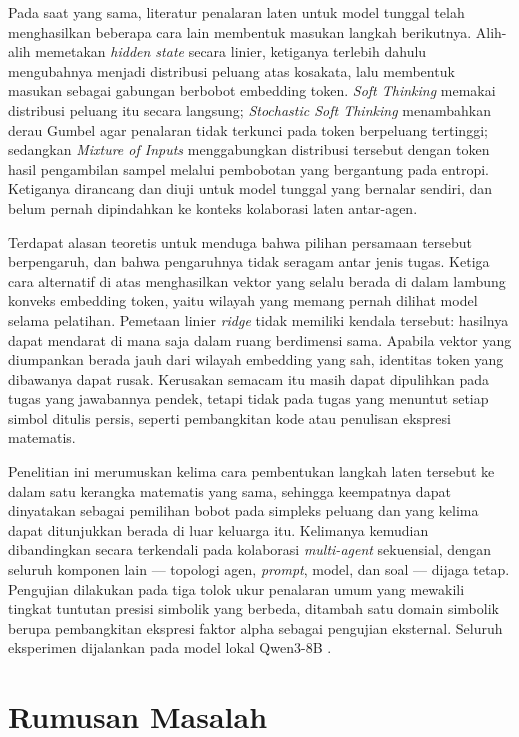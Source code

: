 Pada saat yang sama, literatur penalaran laten untuk model tunggal telah
menghasilkan beberapa cara lain membentuk masukan langkah berikutnya. Alih-alih
memetakan \textit{hidden state} secara linier, ketiganya terlebih dahulu
mengubahnya menjadi distribusi peluang atas kosakata, lalu membentuk masukan
sebagai gabungan berbobot embedding token. \textit{Soft Thinking} memakai
distribusi peluang itu secara langsung; \textit{Stochastic Soft Thinking}
\citep{softthinking} menambahkan derau Gumbel agar penalaran tidak terkunci
pada token berpeluang tertinggi; sedangkan \textit{Mixture of Inputs}
\citep{moi} menggabungkan distribusi tersebut dengan token hasil pengambilan
sampel melalui pembobotan yang bergantung pada entropi. Ketiganya dirancang dan
diuji untuk model tunggal yang bernalar sendiri, dan belum pernah dipindahkan
ke konteks kolaborasi laten antar-agen.

Terdapat alasan teoretis untuk menduga bahwa pilihan persamaan tersebut
berpengaruh, dan bahwa pengaruhnya tidak seragam antar jenis tugas. Ketiga cara
alternatif di atas menghasilkan vektor yang selalu berada di dalam lambung
konveks embedding token, yaitu wilayah yang memang pernah dilihat model selama
pelatihan. Pemetaan linier \textit{ridge} tidak memiliki kendala tersebut:
hasilnya dapat mendarat di mana saja dalam ruang berdimensi sama. Apabila
vektor yang diumpankan berada jauh dari wilayah embedding yang sah, identitas
token yang dibawanya dapat rusak. Kerusakan semacam itu masih dapat dipulihkan
pada tugas yang jawabannya pendek, tetapi tidak pada tugas yang menuntut setiap
simbol ditulis persis, seperti pembangkitan kode atau penulisan ekspresi
matematis.

Penelitian ini merumuskan kelima cara pembentukan langkah laten tersebut ke
dalam satu kerangka matematis yang sama, sehingga keempatnya dapat dinyatakan
sebagai pemilihan bobot pada simpleks peluang dan yang kelima dapat ditunjukkan
berada di luar keluarga itu. Kelimanya kemudian dibandingkan secara terkendali
pada kolaborasi \textit{multi-agent} sekuensial, dengan seluruh komponen lain
--- topologi agen, \textit{prompt}, model, dan soal --- dijaga tetap. Pengujian
dilakukan pada tiga tolok ukur penalaran umum yang mewakili tingkat tuntutan
presisi simbolik yang berbeda, ditambah satu domain simbolik berupa
pembangkitan ekspresi faktor alpha \citep{quantaalpha} sebagai pengujian
eksternal. Seluruh eksperimen dijalankan pada model lokal Qwen3-8B
\citep{qwen3}.

\section{Rumusan Masalah}

